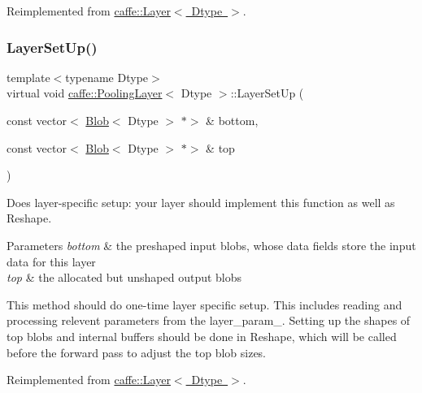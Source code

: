 Reimplemented from \mbox{\hyperlink{classcaffe_1_1_layer_a481323a3e0972c682787f2137468c29f}{caffe\+::\+Layer$<$ Dtype $>$}}.

\mbox{\label{classcaffe_1_1_pooling_layer_a0b00d820b4aeb2f95cfecf3173aaa795}} 
\subsubsection{\texorpdfstring{Layer\+Set\+Up()}{LayerSetUp()}\hspace{0.1cm}{\footnotesize\ttfamily [2/2]}}
{\footnotesize\ttfamily template$<$typename Dtype$>$ \\
virtual void \mbox{\hyperlink{classcaffe_1_1_pooling_layer}{caffe\+::\+Pooling\+Layer}}$<$ Dtype $>$\+::Layer\+Set\+Up (\begin{DoxyParamCaption}\item[{const vector$<$ \mbox{\hyperlink{classcaffe_1_1_blob}{Blob}}$<$ Dtype $>$ $\ast$$>$ \&}]{bottom,  }\item[{const vector$<$ \mbox{\hyperlink{classcaffe_1_1_blob}{Blob}}$<$ Dtype $>$ $\ast$$>$ \&}]{top }\end{DoxyParamCaption})\hspace{0.3cm}{\ttfamily [virtual]}}



Does layer-\/specific setup\+: your layer should implement this function as well as Reshape. 


\begin{DoxyParams}{Parameters}
{\em bottom} & the preshaped input blobs, whose data fields store the input data for this layer \\
\hline
{\em top} & the allocated but unshaped output blobs\\
\hline
\end{DoxyParams}
This method should do one-\/time layer specific setup. This includes reading and processing relevent parameters from the {\ttfamily layer\+\_\+param\+\_\+}. Setting up the shapes of top blobs and internal buffers should be done in {\ttfamily Reshape}, which will be called before the forward pass to adjust the top blob sizes. 

Reimplemented from \mbox{\hyperlink{classcaffe_1_1_layer_a481323a3e0972c682787f2137468c29f}{caffe\+::\+Layer$<$ Dtype $>$}}.

